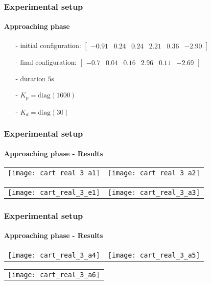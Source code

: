 \begin{frame}
  \frametitle{Experimental setup}
  \framesubtitle{Approaching phase}
  \begin{itemize}
  \item[-] initial configuration: $\begin{bmatrix} -0.91 & 0.24 & 0.24 & 2.21 & 0.36 &-2.90 \end{bmatrix}$
  \item[-] final configuration: $\begin{bmatrix} -0.7 & 0.04 & 0.16 & 2.96 & 0.11 &-2.69 \end{bmatrix}$
  \item[-] duration $5$s
  \item[-] $K_p = \mathrm{diag}(1600)$
  \item[-] $K_d = \mathrm{diag}(30)$
  \end{itemize}
\end{frame}

\begin{frame}
  \frametitle{Experimental setup}
  \framesubtitle{Approaching phase - Results}
  \begin{center}
   \vskip-0.1in
    \begin{tabular}{cc}
      \texttt{[image: cart\_real\_3\_a1]} &
      \texttt{[image: cart\_real\_3\_a2]}
    \end{tabular}
  \end{center}
  \begin{center}
   \vskip-0.1in
    \begin{tabular}{cc}
      \texttt{[image: cart\_real\_3\_e1]} &
      \texttt{[image: cart\_real\_3\_a3]}
    \end{tabular}
  \end{center}
\end{frame}

\begin{frame}
  \frametitle{Experimental setup}
  \framesubtitle{Approaching phase - Results}
  \begin{center}
   \vskip-0.1in
    \begin{tabular}{cc}
      \texttt{[image: cart\_real\_3\_a4]} &
      \texttt{[image: cart\_real\_3\_a5]}
    \end{tabular}
  \end{center}
  \begin{center}
   \vskip-0.1in
    \begin{tabular}{c}
      \texttt{[image: cart\_real\_3\_a6]}
    \end{tabular}
  \end{center}
\end{frame}

